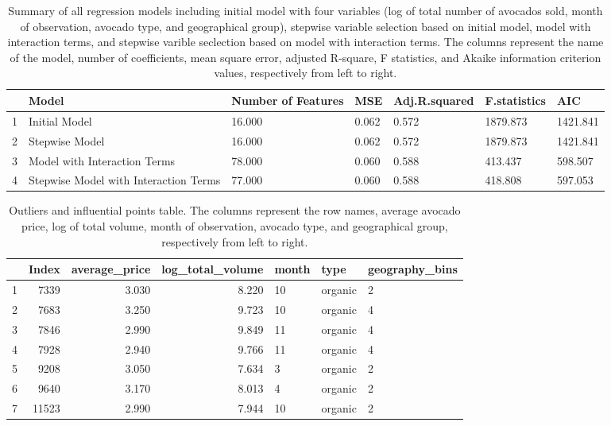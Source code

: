 \documentclass[11pt]{article}\usepackage[]{graphicx}\usepackage[]{color}
\begin{document}
\begin{center}
\begin{table}[ht]
\centering
\begin{tabular}{rp{1.5in}p{.8in}llll}
  \hline
 & Model & Number of Features & MSE & Adj.R.squared & F.statistics & AIC \\ 
  \hline
1 & Initial Model & 16.000 & 0.062 & 0.572 & 1879.873 & 1421.841 \\ 
  2 & Stepwise Model & 16.000 & 0.062 & 0.572 & 1879.873 & 1421.841 \\ 
  3 & Model with Interaction Terms & 78.000 & 0.060 & 0.588 & 413.437 & 598.507 \\ 
  4 & Stepwise Model with Interaction Terms & 77.000 & 0.060 & 0.588 & 418.808 & 597.053 \\ 
   \hline
\end{tabular}
\caption{Summary of all regression models including initial model with four variables (log of total number of avocados sold, month of observation, avocado type, and geographical group), stepwise variable selection based on initial model, model with interaction terms, and stepwise varible seclection based on model with interaction terms. The columns represent the name of the model, number of coefficients, mean square error, adjusted R-square, F statistics, and Akaike information criterion values, respectively from left to right.} 
\label{reg_vali_metric}
\end{table}

\end{center} 


\begin{center}
\begin{table}[ht]
\centering
\begin{tabular}{rrrrlll}
  \hline
 & Index & average\_price & log\_total\_volume & month & type & geography\_bins \\ 
  \hline
1 & 7339 & 3.030 & 8.220 & 10 & organic & 2 \\ 
  2 & 7683 & 3.250 & 9.723 & 10 & organic & 4 \\ 
  3 & 7846 & 2.990 & 9.849 & 11 & organic & 4 \\ 
  4 & 7928 & 2.940 & 9.766 & 11 & organic & 4 \\ 
  5 & 9208 & 3.050 & 7.634 & 3 & organic & 2 \\ 
  6 & 9640 & 3.170 & 8.013 & 4 & organic & 2 \\ 
  7 & 11523 & 2.990 & 7.944 & 10 & organic & 2 \\ 
   \hline
\end{tabular}
\caption{Outliers and influential points table. The columns represent the row names, average avocado price, log of total volume, month of observation, avocado type, and geographical group, respectively from left to right.} 
\label{outliers_table}
\end{table}

\end{center} 
\end{document}
